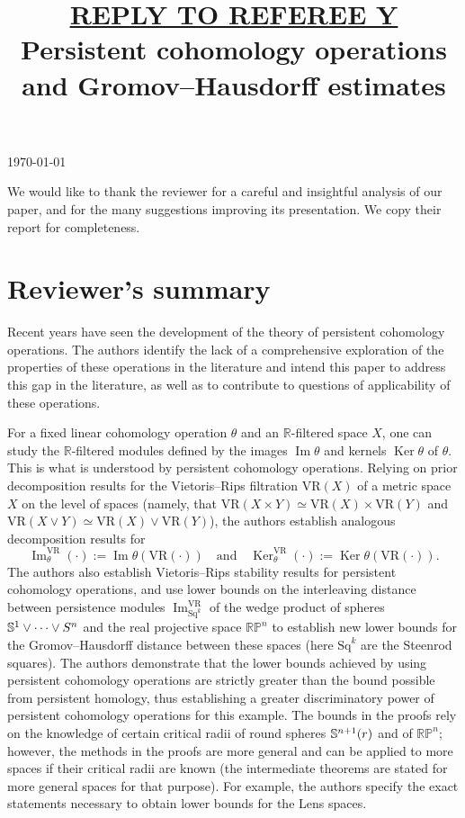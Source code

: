 \documentclass{amsart}
\title[Referee reply]{\underline{REPLY TO REFEREE Y} \\ \medskip Persistent cohomology operations \\ and Gromov--Hausdorff estimates}
\begin{document}
	\noindent\today
	\maketitle

	We would like to thank the reviewer for a careful and insightful analysis of our paper, and for the many suggestions improving its presentation.
	We copy their report for completeness.

	\section{Reviewer's summary}

	Recent years have seen the development of the theory of persistent cohomology operations.
	The authors identify the lack of a comprehensive exploration of the properties of these operations in the literature and intend this paper to address this gap in the literature, as well as to contribute to questions of applicability of these operations.

	For a fixed linear cohomology operation $\theta$ and an $\mathbb{R}$-filtered space $X$, one can study the $\mathbb{R}$-filtered modules defined by the images $\operatorname{Im}\theta$ and kernels $\operatorname{Ker}\theta$ of $\theta$.
	This is what is understood by persistent cohomology operations.
	Relying on prior decomposition results for the Vietoris--Rips filtration $\mathrm{VR}(X)$ of a metric space $X$ on the level of spaces (namely, that $\mathrm{VR}(X \times Y) \simeq \mathrm{VR}(X) \times \mathrm{VR}(Y)$ and $\mathrm{VR}(X \vee Y) \simeq \mathrm{VR}(X) \vee \mathrm{VR}(Y)$), the authors establish analogous decomposition results for
	\[
	\operatorname{Im}^{\mathrm{VR}}_{\theta}(\cdot) := \operatorname{Im}\theta(\mathrm{VR}(\cdot))
	\quad \text{and} \quad
	\operatorname{Ker}^{\mathrm{VR}}_{\theta}(\cdot) := \operatorname{Ker}\theta(\mathrm{VR}(\cdot)).
	\]
	The authors also establish Vietoris--Rips stability results for persistent cohomology operations, and use lower bounds on the interleaving distance between persistence modules $\operatorname{Im}^{\mathrm{VR}}_{\mathrm{Sq}^k}$ of the wedge product of spheres $\mathbb{S}^1 \vee \dots \vee S^n$ and the real projective space $\mathbb{RP}^n$ to establish new lower bounds for the Gromov--Hausdorff distance between these spaces (here $\mathrm{Sq}^k$ are the Steenrod squares).
	The authors demonstrate that the lower bounds achieved by using persistent cohomology operations are strictly greater than the bound possible from persistent homology, thus establishing a greater discriminatory power of persistent cohomology operations for this example.
	The bounds in the proofs rely on the knowledge of certain critical radii of round spheres $\mathbb{S}^{n+1}(r)$ and of $\mathbb{RP}^n$; however, the methods in the proofs are more general and can be applied to more spaces if their critical radii are known (the intermediate theorems are stated for more general spaces for that purpose).
	For example, the authors specify the exact statements necessary to obtain lower bounds for the Lens spaces.
\end{document}
